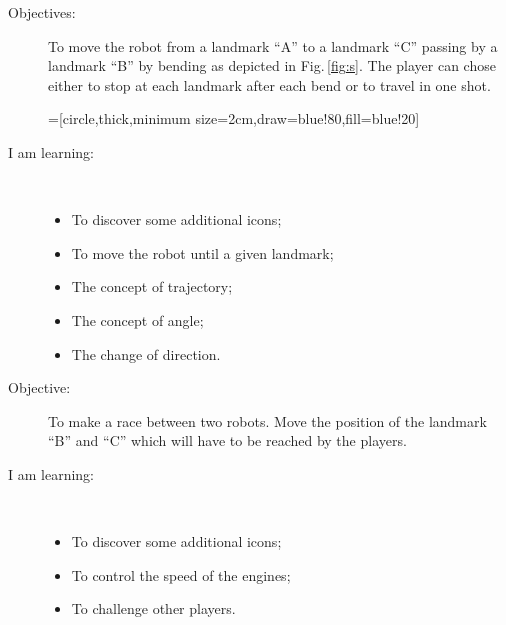 \begin{flushleft}
\begin{description}
\item[Objectives:] To move the robot from a landmark ``A'' to a landmark ``C'' passing by a landmark ``B'' by bending as depicted in Fig.\,\ref{fig:s}. The player can chose either to stop at each landmark after each bend or to travel in one shot.
\begin{minipage}[c]{\textwidth}
\centering
{}=[circle,thick,minimum size=2cm,draw=blue!80,fill=blue!20]
\vspace{1ex}
\label{fig:s}
\end{minipage}
\item[I am learning:] \hfill \\ \vspace{-1ex}
  \begin{itemize}
  \item To discover some additional icons;
  \item To move the robot until a given landmark;
  \item The concept of trajectory;
  \item The concept of angle;
  \item The change of direction.
  \end{itemize}
\end{description}
\end{flushleft}
\frameboxend

\begin{flushleft}
\begin{description}
\item[Objective:] To make a race between two robots. Move the position of the landmark ``B'' and ``C'' which will have to be reached by the players.
\item[I am learning:] \hfill \\ \vspace{-1ex}
  \begin{itemize}
  \item To discover some additional icons;
  \item To control the speed of the engines;
  \item To challenge other players.
  \end{itemize}
\end{description}
\end{flushleft}
\frameboxend
